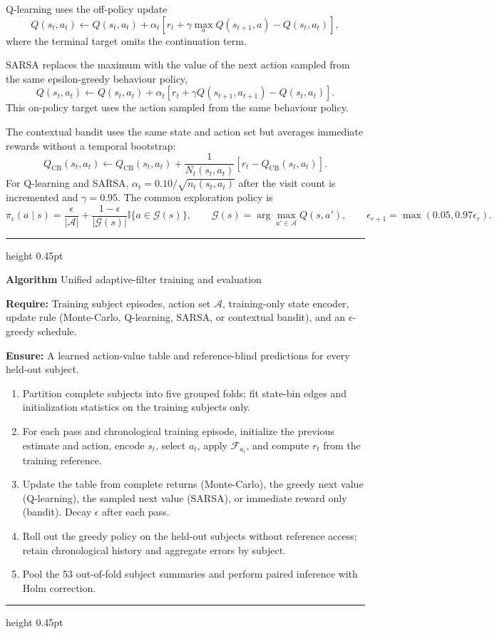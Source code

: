 \documentclass{elektr}
\newcounter{algorithmblock}
\newenvironment{algorithmblock}{%
  \par\medskip\noindent\begin{minipage}{0.96\linewidth}\small
  \setlength{\parindent}{0pt}%
  \hrule height 0.45pt%
  \vspace{4pt}%
}{%
  \vspace{4pt}%
  \hrule height 0.45pt%
  \end{minipage}\par\medskip
}
\newcommand{\algtitle}[1]{%
  \refstepcounter{algorithmblock}\textbf{Algorithm \thealgorithmblock}\quad #1\par\smallskip
}
\newcommand{\algrequire}[1]{\textbf{Require:} #1\par}
\newcommand{\algensure}[1]{\textbf{Ensure:} #1\par\smallskip}
\newenvironment{algsteps}{%
  \begin{enumerate}[label=\arabic*:,leftmargin=2.15em,labelsep=0.55em,
                    itemsep=1pt,topsep=1pt,parsep=0pt]
}{%
  \end{enumerate}
}
\begin{document}
Q-learning uses the off-policy update
\begin{equation}
 Q(s_t,a_t)\leftarrow Q(s_t,a_t)+\alpha_t\left[r_t+\gamma\max_aQ(s_{t+1},a)-Q(s_t,a_t)\right],
 \label{eq:q}
\end{equation}
where the terminal target omits the continuation term.

SARSA replaces the maximum with the value of the next action sampled from the same epsilon-greedy behaviour policy,
\begin{equation}
 Q(s_t,a_t)\leftarrow Q(s_t,a_t)+\alpha_t\left[r_t+\gamma Q(s_{t+1},a_{t+1})-Q(s_t,a_t)\right].
 \label{eq:sarsa}
\end{equation}
This on-policy target uses the action sampled from the same behaviour policy.

The contextual bandit uses the same state and action set but averages immediate rewards without a temporal bootstrap:
\begin{equation}
 Q_{\mathrm{CB}}(s_t,a_t)\leftarrow Q_{\mathrm{CB}}(s_t,a_t)+\frac{1}{N_t(s_t,a_t)}
 \left[r_t-Q_{\mathrm{CB}}(s_t,a_t)\right].
 \label{eq:bandit}
\end{equation}
For Q-learning and SARSA, $\alpha_t=0.10/\sqrt{n_t(s_t,a_t)}$ after the visit count is incremented and $\gamma=0.95$. The common exploration policy is
\begin{equation}
 \pi_{\epsilon}(a\mid s)=
 \frac{\epsilon}{|\mathcal{A}|}+
 \frac{1-\epsilon}{|\mathcal{G}(s)|}\mathbb{I}\{a\in\mathcal{G}(s)\},
 \qquad \mathcal{G}(s)=\arg\max_{a'\in\mathcal{A}}Q(s,a'),
 \qquad
 \epsilon_{r+1}=\max(0.05,0.97\epsilon_r).
 \label{eq:policy}
\end{equation}

\begin{algorithmblock}
\algtitle{Unified adaptive-filter training and evaluation}\label{alg:training}
\algrequire{Training subject episodes, action set $\mathcal{A}$, training-only
state encoder, update rule (Monte-Carlo, Q-learning, SARSA, or contextual bandit),
and an $\epsilon$-greedy schedule.}
\algensure{A learned action-value table and reference-blind predictions for every
held-out subject.}
\begin{algsteps}
\item Partition complete subjects into five grouped folds; fit state-bin edges
and initialization statistics on the training subjects only.
\item For each pass and chronological training episode, initialize the previous
estimate and action, encode $s_t$, select $a_t$, apply $\mathcal{F}_{a_t}$, and
compute $r_t$ from the training reference.
\item Update the table from complete returns (Monte-Carlo), the greedy next value
(Q-learning), the sampled next value (SARSA), or immediate reward only (bandit).
Decay $\epsilon$ after each pass.
\item Roll out the greedy policy on the held-out subjects without reference
access; retain chronological history and aggregate errors by subject.
\item Pool the 53 out-of-fold subject summaries and perform paired inference
with Holm correction.
\end{algsteps}
\end{algorithmblock}
\end{document}
